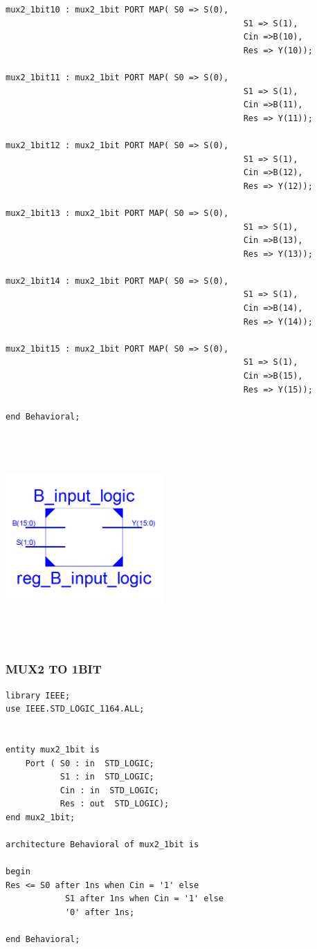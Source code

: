 \documentclass{article}
\begin{document}
\begin{lstlisting}
mux2_1bit10 : mux2_1bit PORT MAP( S0 => S(0),
												S1 => S(1),
												Cin =>B(10),
												Res => Y(10));
					
mux2_1bit11 : mux2_1bit PORT MAP( S0 => S(0),
												S1 => S(1),
												Cin =>B(11),
												Res => Y(11));
												
mux2_1bit12 : mux2_1bit PORT MAP( S0 => S(0),
												S1 => S(1),
												Cin =>B(12),
												Res => Y(12));
					
mux2_1bit13 : mux2_1bit PORT MAP( S0 => S(0),
												S1 => S(1),
												Cin =>B(13),
												Res => Y(13));
												
mux2_1bit14 : mux2_1bit PORT MAP( S0 => S(0),
												S1 => S(1),
												Cin =>B(14),
												Res => Y(14));
					
mux2_1bit15 : mux2_1bit PORT MAP( S0 => S(0),
												S1 => S(1),
												Cin =>B(15),
												Res => Y(15));

end Behavioral;
\end{lstlisting}

\includegraphics[width=6cm, height=8cm]{binput1.png}
\pagebreak


\subsubsection{MUX2 TO 1BIT}\label{sec:result}

\begin{lstlisting}
library IEEE;
use IEEE.STD_LOGIC_1164.ALL;


entity mux2_1bit is
    Port ( S0 : in  STD_LOGIC;
           S1 : in  STD_LOGIC;
           Cin : in  STD_LOGIC;
           Res : out  STD_LOGIC);
end mux2_1bit;

architecture Behavioral of mux2_1bit is

begin
Res <= S0 after 1ns when Cin = '1' else
			S1 after 1ns when Cin = '1' else
			'0' after 1ns;

end Behavioral;
\end{lstlisting}
\end{document}
